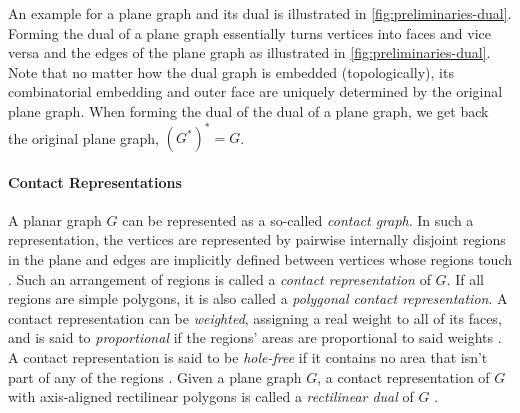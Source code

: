 An example for a plane graph and its dual is illustrated in \cref{fig:preliminaries-dual}. Forming the dual of a plane graph essentially turns vertices into faces and vice versa and  the edges of the plane graph as illustrated in \cref{fig:preliminaries-dual}. Note that no matter how the dual graph is embedded (topologically), its combinatorial embedding and outer face are uniquely determined by the original plane graph. When forming the dual of the dual of a plane graph, we get back the original plane graph, \ie{} $(G^*)^* = G$.




\paragraph{Contact Representations}

\begin{definition}
	A planar graph $G$ can be represented as a so-called \emph{contact graph}. In such a representation, the vertices are represented by pairwise internally disjoint regions in the plane and edges are implicitly defined between vertices whose regions touch \cite{alam2013linear}.
	Such an arrangement of regions is called a \emph{contact representation} of $G$. If all regions are simple polygons, it is also called a \emph{polygonal contact representation}.
	A contact representation can be \emph{weighted}, assigning a real weight to all of its faces, and is said to \emph{proportional} if the regions' areas are proportional to said weights \cite{alam2013linear}.
	A contact representation is said to be \emph{hole-free} if it contains no area that isn't part of any of the regions \cite{alam2013linear}.
	Given a plane graph $G$, a contact representation of $G$ with axis-aligned rectilinear polygons is called a \emph{rectilinear dual} of $G$ \cite{alam2013computing}.
\end{definition}

